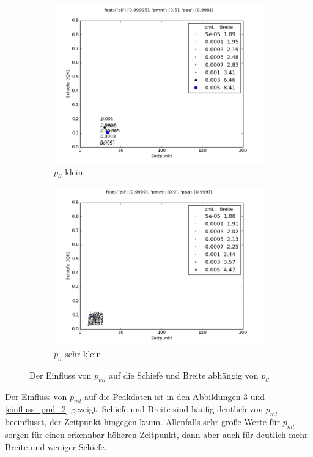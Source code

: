 \begin{figure}
\begin{subfigure}[b]{0.49\textwidth}
\includegraphics[width=\textwidth]{bilder/pml/pml_05_p_0998_099995}
\caption{$p_{ll}$ klein}
\label{einfluss_pml_pll-}
\end{subfigure}
\begin{subfigure}[b]{0.49\textwidth}
\includegraphics[width=\textwidth]{bilder/pml/pml_09_p_0999_09999}
\caption{$p_{ll}$ sehr klein}
\label{einfluss_pml_pll--}
\end{subfigure}
\caption{Der Einfluss von $p_{ml}$ auf die Schiefe und Breite abhängig von $p_{ll}$}
\label{einfluss_pml_1}
\end{figure}

Der Einfluss von $p_{ml}$ auf die Peakdaten ist in den Abbildungen \ref{einfluss_pml_1} und \ref{einfluss_pml_2} gezeigt. Schiefe und Breite sind häufig deutlich von $p_{ml}$ beeinflusst, der Zeitpunkt hingegen kaum. Allenfalls sehr große Werte für $p_{ml}$ sorgen für einen erkennbar höheren Zeitpunkt, dann aber auch für deutlich mehr Breite und weniger Schiefe.

